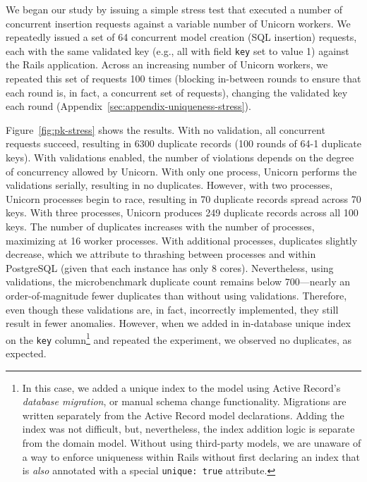  We began our study by issuing a simple stress
test that executed a number of concurrent insertion requests against a
variable number of Unicorn workers. We repeatedly issued a set of 64
concurrent model creation (SQL insertion) requests, each with the same
validated key (e.g., all with field \texttt{key} set to value 1)
against the Rails application. Across an increasing number of Unicorn
workers, we repeated this set of requests 100 times (blocking
in-between rounds to ensure that each round is, in fact, a concurrent
set of requests), changing the validated key each round
(Appendix~\ref{sec:appendix-uniqueness-stress}).

Figure~\ref{fig:pk-stress} shows the results. With no validation, all
concurrent requests succeed, resulting in 6300 duplicate records (100
rounds of 64-1 duplicate keys). With validations enabled, the number
of violations depends on the degree of concurrency allowed by
Unicorn. With only one process, Unicorn performs the validations
serially, resulting in no duplicates. However, with two processes,
Unicorn processes begin to race, resulting in 70 duplicate records
spread across 70 keys. With three processes, Unicorn produces 249
duplicate records across all 100 keys. The number of duplicates
increases with the number of processes, maximizing at 16 worker
processes. With additional processes, duplicates slightly decrease,
which we attribute to thrashing between processes and within
PostgreSQL (given that each instance has only 8 cores). Nevertheless,
using validations, the microbenchmark duplicate count remains below
700---nearly an order-of-magnitude fewer duplicates than without using
validations. Therefore, even though these validations are, in fact,
incorrectly implemented, they still result in fewer
anomalies. However, when we added in in-database unique index on the
\texttt{key} column\footnote{In this case, we added a unique index to
  the model using Active Record's \textit{database migration}, or
  manual schema change functionality. Migrations are written
  separately from the Active Record model declarations. Adding the
  index was not difficult, but, nevertheless, the index addition logic
  is separate from the domain model. Without using third-party models,
  we are unaware of a way to enforce uniqueness within Rails without
  first declaring an index that is \textit{also} annotated with a
  special \texttt{unique: true} attribute.} and repeated the
experiment, we observed no duplicates, as expected.

